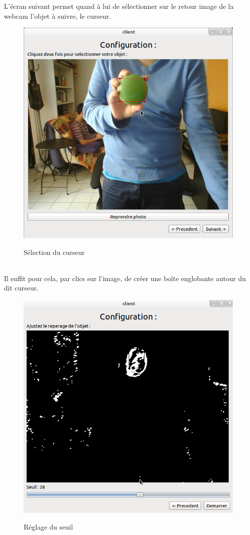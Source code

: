 \documentclass{report}
\begin{document}
				\newpage
				L'écran suivant permet quand à lui de sélectionner sur le retour image de la webcam l'objet à suivre, le curseur.\\
				\begin{figure}[!h]
						\centering
						\includegraphics[scale=0.4]{../images/Capture1.png}\\
						\caption{Sélection du curseur}
						\label{Sélection du curseur}
				\end{figure}\\
				Il suffit pour cela, par clics sur l'image, de créer une boîte englobante autour du dit curseur.
				\newpage
				\begin{figure}[!h]
						\centering
						\includegraphics[scale=0.4]{../images/Capture2.png}\\
						\caption{Réglage du seuil}
						\label{Réglage du seuil}
				\end{figure}
\end{document}

